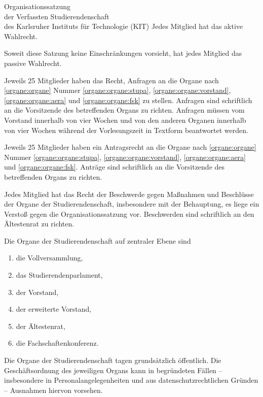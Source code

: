 \begin{jurdoc}[Organisationssatzung]{Organisationssatzung\\der Verfassten Studierendenschaft\\des Karlsruher Instituts für Technologie (KIT)}
Jedes Mitglied hat das aktive Wahlrecht.

Soweit diese Satzung keine Einschränkungen vorsieht, hat jedes Mitglied das passive Wahlrecht.

Jeweils 25 Mitglieder haben das Recht, Anfragen an die Organe nach \ref{organe:organe} Nummer \ref{organe:organe:stupa}, \ref{organe:organe:vorstand}, \ref{organe:organe:aera} und \ref{organe:organe:fsk} zu stellen. Anfragen sind schriftlich an die Vorsitzende des betreffenden Organs zu richten.
Anfragen müssen vom Vorstand innerhalb von vier Wochen und von den anderen Organen innerhalb von vier Wochen während der Vorlesungszeit in Textform beantwortet werden.\label{studierendenschaft:mitglieder:anfragen}

Jeweils 25 Mitglieder haben ein Antragsrecht an die Organe nach \ref{organe:organe} Nummer \ref{organe:organe:stupa}, \ref{organe:organe:vorstand}, \ref{organe:organe:aera} und \ref{organe:organe:fsk}. Anträge sind schriftlich an die Vorsitzende des betreffenden Organs zu richten.\label{studierendenschaft:mitglieder:antraege}

Jedes Mitglied hat das Recht der Beschwerde gegen Maßnahmen und Beschlüsse der Organe der Studierendenschaft, insbesondere mit der Behauptung, es liege ein Verstoß gegen die Organisationssatzung vor. Beschwerden sind schriftlich an den Ältestenrat zu richten. \label{studierendenschaft:mitglieder:beschwerden}


Die Organe der Studierendenschaft auf zentraler Ebene sind \label{organe:organe}
\begin{enumerate}
\item die Vollversammlung,
\item das Studierendenparlament, \label{organe:organe:stupa}
\item der Vorstand, \label{organe:organe:vorstand}
\item der erweiterte Vorstand,
\item der Ältestenrat, \label{organe:organe:aera}
\item die Fachschaftenkonferenz. \label{organe:organe:fsk}
\end{enumerate}

Die Organe der Studierendenschaft tagen grundsätzlich öffentlich. Die Geschäftsordnung des jeweiligen Organs kann in begründeten Fällen -- insbesondere in Personalangelegenheiten und aus datenschutzrechtlichen Gründen -- Ausnahmen hiervon vorsehen.


\end{jurdoc}
